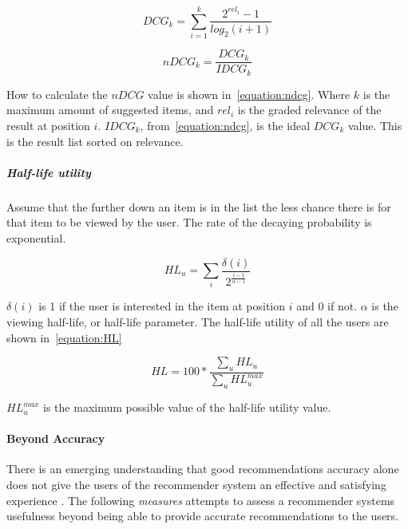 \begin{equation}
    DCG_k = \sum_{i=1}^{k}{\frac{2^{rel_i}-1}{log_2(i+1)}}
    \label{equation:dcg}
\end{equation}

\begin{equation}
    nDCG_k = \frac{DCG_k}{IDCG_k}
    \label{equation:ndcg}
\end{equation}

How to calculate the $nDCG$ value is shown in~\ref{equation:ndcg}.
Where $k$ is the maximum amount of suggested items, and $rel_i$ is the graded relevance of the result at position $i$.
$IDCG_k$, from~\ref{equation:ndcg}, is the ideal $DCG_k$ value.
This is the result list sorted on relevance.

\subparagraph{Half-life utility~\cite{Breese:1998:EAP:2074094.2074100}}

Assume that the further down an item is in the list the less chance there is for that item to be viewed by the user.
The rate of the decaying probability is exponential.

\begin{equation}
	HL_u = \sum_{i}{\frac{\delta(i)}{2^{\frac{i-1}{\alpha-1}}}}
\end{equation}

$\delta(i)$ is 1 if the user is interested in the item at position $i$ and 0 if not.
$\alpha$ is the viewing half-life, or half-life parameter.
The half-life utility of all the users are shown in~\ref{equation:HL}

\begin{equation}
	HL = 100 * \frac{\sum_u{HL_u}}{\sum_u{HL_u^{max}}}
	\label{equation:HL}
\end{equation}

$HL_u^{max}$ is the maximum possible value of the half-life utility value.



\paragraph{Beyond Accuracy}
There is an emerging understanding that good recommendations accuracy alone does not give the users of the recommender system an effective and satisfying experience \cite{Herlocker2004}. The following \emph{measures} attempts to assess a recommender systems usefulness beyond being able to provide accurate recommendations to the users.

